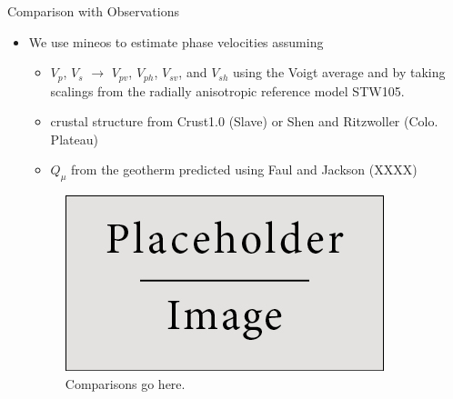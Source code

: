\documentclass[final]{beamer}
\newlength{\onecolwid}
\newlength{\twocolwid}
\begin{document}
\begin{frame}[t]
\begin{columns}[t]
\begin{column}{\twocolwid}
\begin{columns}[t,totalwidth=\twocolwid]
\end{columns} %





\begin{columns}[t,totalwidth=\twocolwid] %

\begin{column}{\onecolwid} %


\begin{alertblock}{Comparison with Observations}

\begin{itemize}

\item We use mineos to estimate phase velocities assuming

\begin{itemize}

\item $V_{p}$, $V_{s}$ $\rightarrow$ $V_{pv}$, $V_{ph}$, $V_{sv}$, and $V_{sh}$ using the Voigt average and by taking scalings from the radially anisotropic reference model STW105.
\item crustal structure from Crust1.0 (Slave) or Shen and Ritzwoller (Colo. Plateau)
\item $Q_\mu$ from the geotherm predicted using Faul and Jackson (XXXX)

\end{itemize}

\begin{figure}
\includegraphics{img/placeholder.jpg}
\caption{Comparisons go here.}
\end{figure}


\end{itemize}
\end{alertblock}
\end{column}
\end{columns}
\end{column}
\end{columns}
\end{frame}
\end{document}
